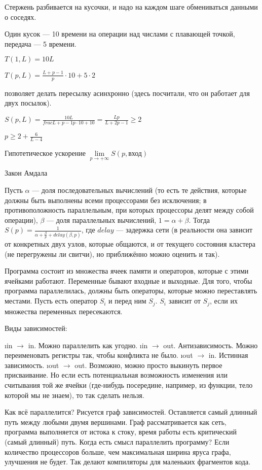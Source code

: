 Стержень разбивается на кусочки, и надо на каждом шаге обмениваться данными о соседях.

Один кусок --- 10 времени на операции над числами с плавающей точкой, передача --- 5 времени.

$T(1, L) = 10 L$

$T(p, L) = \frac{L+p-1}{p} \cdot 10 + 5 \cdot 2$

 позволяет делать пересылку асинхронно (здесь посчитали, что он работает для двух посылок).

$S(p, L) = \frac{10L}{frac{L+p-1}{p} \cdot 10 + 10} = \frac{Lp}{L+2p-1} \ge 2$

$p \ge 2+\frac{6}{L-4}$

Гипотетическое ускорение
 $\lim\limits_{p \to +\infty} S(p, \text{вход})$
 
Закон Амдала

Пусть $\alpha$ --- доля последовательных вычислений (то есть те действия, которые должны быть выполнены всеми процессорами без исключения; в противоположность параллельным, при которых процессоры делят между собой операции), $\beta$ --- доля параллельных вычислений, $1 = \alpha + \beta$. Тогда $S(p) = \frac{1}{\alpha+\frac{\beta}{p}+ delay(\beta, p)}$, где $delay$ --- задержка сети (в реальности она зависит от конкретных двух узлов, которые общаются, и от текущего состояния кластера (не перегружены ли свитчи), но приближённо можно оценить и так).

Программа состоит из множества ячеек памяти и операторов, которые с этими ячейками работают. Переменные бывают входные и выходные. Для того, чтобы программа параллелилась, должны быть операторы, которые можно переставлять местами. 
Пусть есть оператор $S_i$ и перед ним $S_j$. $S_i$ зависит от $S_j$, если их множества переменных пересекаются.

Виды зависимостей:
\begin{enumerate}
\i in $\to$ in. Можно параллелить как угодно.
\i in $\to$ out. Антизависимость. Можно переименовать регистры так, чтобы конфликта не было.
\i out $\to$ in. Истинная зависимость.
\i out $\to$ out. Возможно, можно просто выкинуть первое присваивание. Но если есть потенциальная возможность изменения или считывания той же ячейки (где-нибудь посередине, например, из функции, тело которой мы не знаем), то так сделать нельзя.

Как всё параллелится?
Рисуется граф зависимостей. Оставляется самый длинный путь между любыми двумя вершинами. Граф рассматривается как сеть, программа выполняется от истока к стоку, время работы есть критический (самый длинный) путь.
Когда есть смысл параллелить программу? Если количество процессоров больше, чем максимальная ширина яруса графа, улучшения не будет.
Так делают компиляторы для маленьких фрагментов кода.
\end{enumerate}



